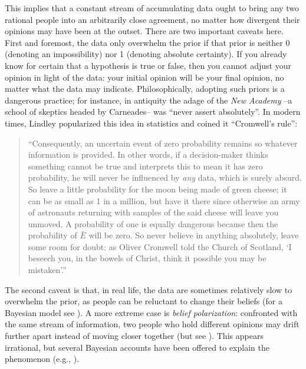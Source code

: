 \documentclass[man]{apa7}
\begin{document}
This implies that a constant stream of accumulating data ought to bring any two rational people into an arbitrarily close agreement, no matter how divergent their opinions may have been at the outset. There are two important caveats here. First and foremost, the data only overwhelm the prior if that prior is neither 0 (denoting an impossibility) nor 1 (denoting absolute certainty). If you already know for certain that a hypothesis is true or false, then you cannot adjust your opinion in light of the data: your initial opinion will be your final opinion, no matter what the data may indicate. Philosophically, adopting such priors is a dangerous practice; for instance, in antiquity the adage of the \emph{New Academy} --a school of skeptics headed by Carneades-- was ``never assert absolutely''. In modern times, Lindley popularized this idea in statistics and coined it ``Cromwell's rule'':
\begin{quotation}
``Consequently, an uncertain event of zero probability remains so whatever information is provided. In other words, if a decision-maker thinks something cannot be true and interprets this to mean it has zero probability, he will never be influenced by \emph{any} data, which is surely absurd. So leave a little probability for the moon being made of green cheese; it can be as small as 1 in a million, but have it there since otherwise an army of astronauts returning with samples of the said cheese will leave you unmoved. A probability of one is equally dangerous because then the probability of $\bar{E}$ will be zero. So never believe in anything absolutely, leave some room for doubt: as Oliver Cromwell told the Church of Scotland, `I beseech you, in the bowels of Christ, think it possible you may be mistaken'.'' \parencite[p. 104]{Lindley1985} 
\end{quotation}

The second caveat is that, in real life, the data are sometimes relatively slow to overwhelm the prior, as people can be reluctant to change their beliefs (for a Bayesian model see \cite{Gershman2019}). A more extreme case is \emph{belief polarization}: confronted with the same stream of information, two people who hold different opinions may drift further apart instead of moving closer together (but see \cite{Anglin2019}). This appears irrational, but several Bayesian accounts have been offered to explain the phenomenon (e.g., \cite{CookLewandowsky2016,JernEtAl2014}).
\end{document}
